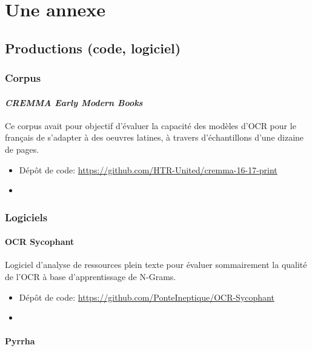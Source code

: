 \appendix

\chapter*{Une annexe}

\section*{Productions (code, logiciel)}

\subsection*{Corpus}

\subsubsection*{\textit{CREMMA Early Modern Books}}

Ce corpus avait pour objectif d'évaluer la capacité des modèles d'OCR pour le français de s'adapter à des oeuvres latines, à travers d'échantillons d'une dizaine de pages. 

\begin{itemize}
    \item Dépôt de code: \url{https://github.com/HTR-United/cremma-16-17-print}
    \item \cite{Clerice_CREMMA_16_18_Prints_2021}
\end{itemize}

\subsection*{Logiciels}

\subsubsection*{OCR Sycophant}

Logiciel d'analyse de ressources plein texte pour évaluer sommairement la qualité de l'OCR à base d'apprentissage de N-Grams.

\begin{itemize}
    \item Dépôt de code: \url{https://github.com/PonteIneptique/OCR-Sycophant}
    \item \cite{Clerice_OCR_Sycophant_2021}
\end{itemize}

\subsubsection*{Pyrrha}

